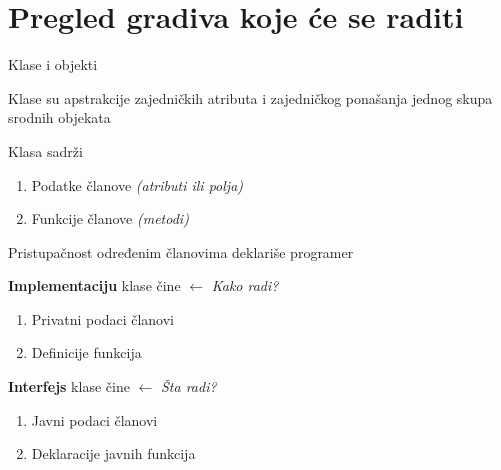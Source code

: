 \documentclass{article}
\newenvironment{xitemize}{%
    
    \itemize
    \larger
}{%
    \enditemize
}
\let\olditemize\itemize
\let\endolditemize\enditemize
\renewenvironment{itemize}{%
    \smaller
    \olditemize
}{%
    \endolditemize
}
\begin{document}
\section{Pregled gradiva koje će se raditi}
\begin{xitemize}
    \item Klase i objekti
    \begin{itemize}
        \item Klase su apstrakcije zajedničkih atributa i zajedničkog ponašanja jednog skupa srodnih objekata
        \item Klasa sadrži
        \begin{enumerate}
            \item Podatke članove \textit{(atributi ili polja)}
            \item Funkcije članove \textit{(metodi)}
        \end{enumerate}
        \item Pristupačnost određenim članovima deklariše programer
        \item \textbf{Implementaciju} klase čine $\longleftarrow$ \textit{Kako radi?}
        \begin{enumerate}
            \item Privatni podaci članovi
            \item Definicije funkcija
        \end{enumerate}
        \item \textbf{Interfejs} klase čine $\longleftarrow$ \textit{Šta radi?}
        \begin{enumerate}
            \item Javni podaci članovi
            \item Deklaracije javnih funkcija 
        \end{enumerate}


\end{itemize}
\end{xitemize}
\end{document}
